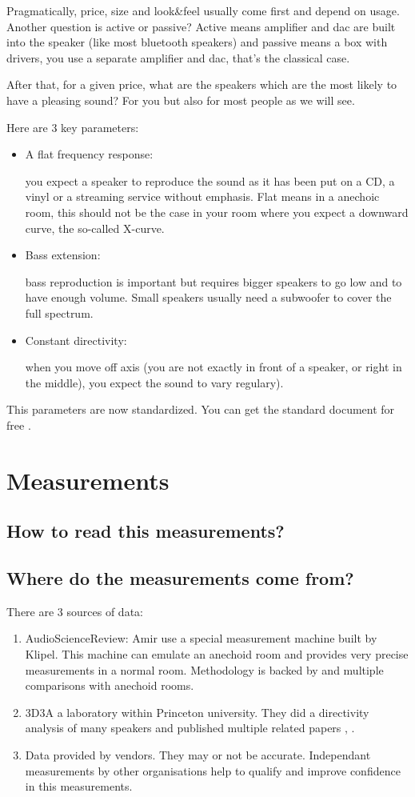 \documentclass{tufte-book}
\begin{document}
Pragmatically, price, size and look\&feel usually come first and depend on usage. Another question is
active or passive? Active means amplifier and dac are built into the speaker (like most bluetooth speakers)
and passive means a box with drivers, you use a separate amplifier and dac, that's the classical case.

After that, for a given price, what are the speakers which are the most likely to have a pleasing sound? For you
but also for most people as we will see.

Here are 3 key parameters:
\begin{itemize}
\item A flat frequency response:

  you expect a speaker to reproduce the sound as it has been put on a CD, a vinyl or a streaming service
  without emphasis. Flat means in a anechoic room, this should not be the case in your room where you expect
  a downward curve, the so-called X-curve.
\item Bass extension:

  bass reproduction is important but requires bigger speakers to go low and to have enough volume. Small speakers
  usually need a subwoofer to cover the full spectrum.
\item Constant directivity:

  when you move off axis (you are not exactly in front of a speaker, or right in the middle), you expect the sound
  to vary regulary).
\end{itemize}

This parameters are now standardized. You can get the standard document for free \cite{CEA2034}.

\chapter{Measurements}

\section{How to read this measurements?}
\section{Where do the measurements come from?}
There are 3 sources of data:
\begin{enumerate}
\item AudioScienceReview: Amir use a special measurement machine built by Klipel. This machine can emulate an anechoid room and provides very precise measurements in a normal room. Methodology is backed by \cite{Klippel2016} and multiple comparisons with anechoid rooms.
\item 3D3A a laboratory within Princeton university. They did a directivity analysis of many speakers \cite{Tylka2015} and published multiple related papers \cite{Tylka2015}, \cite{Tylka2014}.
\item Data provided by vendors. They may or not be accurate. Independant measurements by other organisations help to qualify and improve confidence in this measurements.
\end{enumerate}
\end{document}
